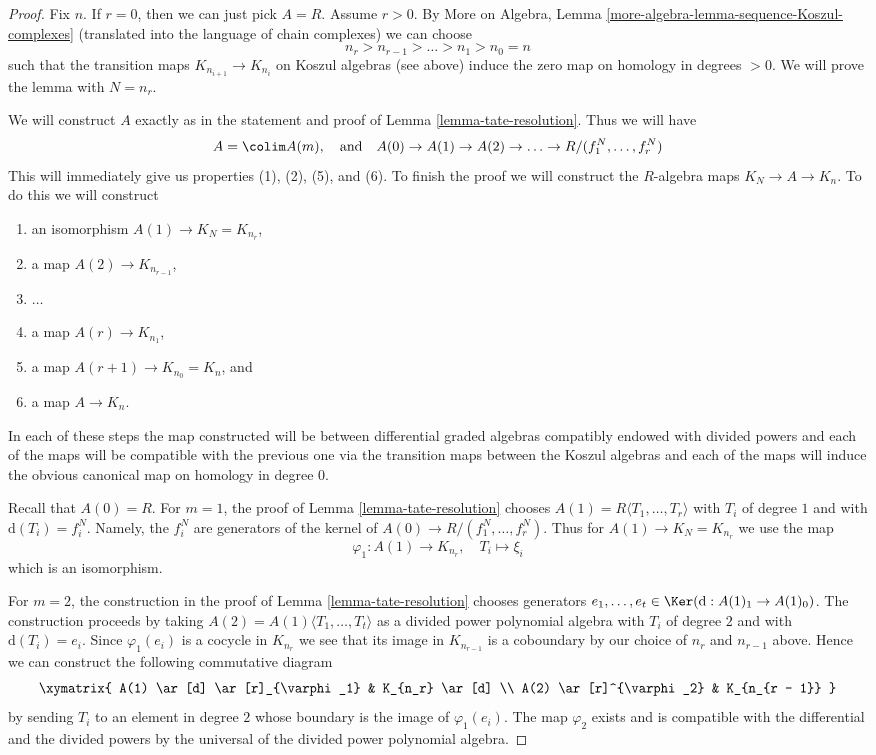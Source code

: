 \begin{proof}
Fix $n$. If $r = 0$, then we can just pick $A = R$. Assume $r > 0$. By
More on Algebra, Lemma \ref{more-algebra-lemma-sequence-Koszul-complexes}
(translated into the language of chain complexes) we can choose
$$
n_{r} > n_{r - 1} > \ldots > n_1 > n_0 = n
$$
such that the transition maps $K_{n_{i + 1}} \to K_{n_i}$ on Koszul
algebras (see above) induce the zero map on homology in degrees $> 0$.
We will prove the lemma with $N = n_r$.

\medskip\noindent
We will construct $A$ exactly as in the statement and proof of
Lemma \ref{lemma-tate-resolution}. Thus we will have
$$
A = \colim A(m),\quad\text{and}\quad
A(0) \to A(1) \to A(2) \to \ldots \to R/(f_1^N, \ldots, f_r^N)
$$
This will immediately give us properties (1), (2), (5), and (6).
To finish the proof we will construct the $R$-algebra maps
$K_N \to A \to K_n$. To do this we will construct
\begin{enumerate}
\item an isomorphism $A(1) \to K_N = K_{n_r}$,
\item a map $A(2) \to K_{n_{r - 1}}$,
\item $\ldots$
\item a map $A(r) \to K_{n_1}$,
\item a map $A(r + 1) \to K_{n_0} = K_n$, and
\item a map $A \to K_n$.
\end{enumerate}
In each of these steps the map constructed will be between
differential graded algebras compatibly endowed with divided powers
and each of the maps will be compatible with the
previous one via the transition maps between the Koszul algebras
and each of the maps will induce the obvious canonical map
on homology in degree $0$.

\medskip\noindent
Recall that $A(0) = R$. For $m = 1$, the proof of
Lemma \ref{lemma-tate-resolution}
chooses $A(1) = R\langle T_1, \ldots, T_r\rangle$ with
$T_i$ of degree $1$ and with $\text{d}(T_i) = f_i^N$.
Namely, the $f_i^N$ are generators of the kernel of
$A(0) \to R/(f_1^N, \ldots, f_r^N)$.
Thus for $A(1) \to K_N = K_{n_r}$ we use the map
$$
\varphi_1 : A(1) \longrightarrow K_{n_r},\quad T_i \longmapsto \xi_i
$$
which is an isomorphism.

\medskip\noindent
For $m = 2$, the construction in the proof of Lemma \ref{lemma-tate-resolution}
chooses generators $e_1, \ldots, e_t \in \Ker(\text{d} : A(1)_1 \to A(1)_0)$.
The construction proceeds by taking
$A(2) = A(1)\langle T_1, \ldots, T_t\rangle$
as a divided power polynomial algebra with $T_i$ of degree $2$
and with $\text{d}(T_i) = e_i$.
Since $\varphi_1(e_i)$ is a cocycle in $K_{n_r}$
we see that its image in $K_{n_{r - 1}}$ is a coboundary by
our choice of $n_r$ and $n_{r - 1}$ above.
Hence we can construct the following commutative diagram
$$
\xymatrix{
A(1) \ar[d] \ar[r]_{\varphi_1} & K_{n_r} \ar[d] \\
A(2) \ar[r]^{\varphi_2} & K_{n_{r - 1}}
}
$$
by sending $T_i$ to an element in degree $2$ whose boundary is the
image of $\varphi_1(e_i)$. The map $\varphi_2$ exists and is compatible
with the differential and the divided powers by the universal
of the divided power polynomial algebra.


\end{proof}
